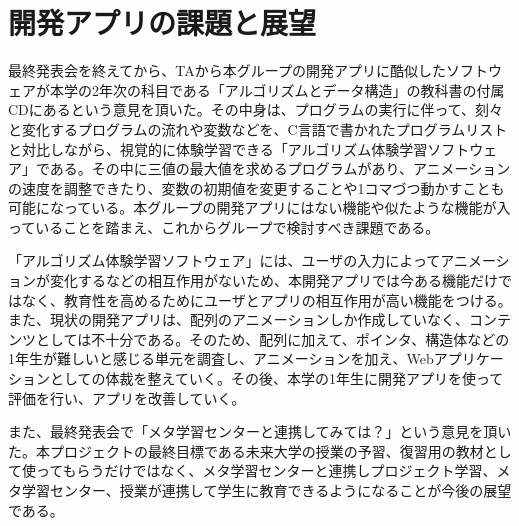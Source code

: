 \documentclass[openany,11pt,papersize]{jsbook}
\begin{document}
\section{開発アプリの課題と展望}
最終発表会を終えてから、TAから本グループの開発アプリに酷似したソフトウェアが本学の2年次の科目である「アルゴリズムとデータ構造」の教科書の付属CDにあるという意見を頂いた。その中身は、プログラムの実行に伴って、刻々と変化するプログラムの流れや変数などを、C言語で書かれたプログラムリストと対比しながら、視覚的に体験学習できる「アルゴリズム体験学習ソフトウェア」である。その中に三値の最大値を求めるプログラムがあり、アニメーションの速度を調整できたり、変数の初期値を変更することや1コマづつ動かすことも可能になっている。本グループの開発アプリにはない機能や似たような機能が入っていることを踏まえ、これからグループで検討すべき課題である。

\par
「アルゴリズム体験学習ソフトウェア」には、ユーザの入力によってアニメーションが変化するなどの相互作用がないため、本開発アプリでは今ある機能だけではなく、教育性を高めるためにユーザとアプリの相互作用が高い機能をつける。また、現状の開発アプリは、配列のアニメーションしか作成していなく、コンテンツとしては不十分である。そのため、配列に加えて、ポインタ、構造体などの1年生が難しいと感じる単元を調査し、アニメーションを加え、Webアプリケーションとしての体裁を整えていく。その後、本学の1年生に開発アプリを使って評価を行い、アプリを改善していく。

\par
また、最終発表会で「メタ学習センターと連携してみては？」という意見を頂いた。本プロジェクトの最終目標である未来大学の授業の予習、復習用の教材として使ってもらうだけではなく、メタ学習センターと連携しプロジェクト学習、メタ学習センター、授業が連携して学生に教育できるようになることが今後の展望である。


\end{document}
